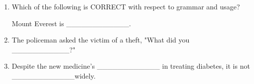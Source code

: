 \documentclass[journal,11pt,onecolumn]{IEEEtran}
\begin{document}
\begin{enumerate}

    \item Which of the following is CORRECT with respect to grammar and usage?

          Mount Everest is \_\_\_\_\_\_\_\_\_\_\_\_.

          \begin{enumerate}


          \end{enumerate}

    \item The policeman asked the victim of a theft, "What did you \_\_\_\_\_\_\_\_\_\_\_?"

          \begin{enumerate}


          \end{enumerate}

    \item Despite the new medicine's \_\_\_\_\_\_\_\_\_\_\_\_ in treating diabetes, it is not \_\_\_\_\_\_\_\_\_\_\_\_widely.


\end{enumerate}
\end{document}
